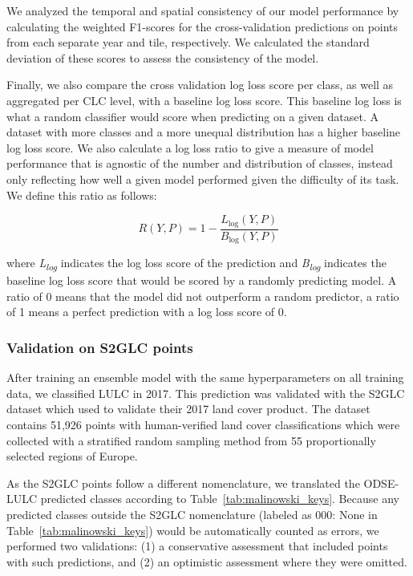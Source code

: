         We analyzed the temporal and spatial consistency of our model performance by calculating the weighted F1-scores for the cross-validation predictions on points from each separate year and tile, respectively. We calculated the standard deviation of these scores to assess the consistency of the model. 
        
        Finally, we also compare the cross validation log loss score per class, as well as aggregated per CLC level, with a baseline log loss score. This baseline log loss is what a random classifier would score when predicting on a given dataset. A dataset with more classes and a more unequal distribution has a higher baseline log loss score. We also calculate a log loss ratio to give a measure of model performance that is agnostic of the number and distribution of classes, instead only reflecting how well a given model performed given the difficulty of its task. We define this ratio as follows:
        
        \begin{equation}
            R(Y,P) = 1-\frac{L_{\log}(Y, P)}{B_{\log}(Y, P)}
        \end{equation}
        
        \noindent where \emph{L\textsubscript{log}} indicates the log loss score of the prediction and \emph{B\textsubscript{log}} indicates the baseline log loss score that would be scored by a randomly predicting model. A ratio of 0 means that the model did not outperform a random predictor, a ratio of 1 means a perfect prediction with a log loss score of 0.
    
    \subsubsection*{Validation on S2GLC points}
        
        After training an ensemble model with the same hyperparameters on all training data, we classified LULC in 2017. This prediction was validated with the S2GLC dataset which \citet{malinowski2020} used to validate their 2017 land cover product. The dataset contains 51,926 points with human-verified land cover classifications which were collected with a stratified random sampling method from 55 proportionally selected regions of Europe.
        
        As the S2GLC points follow a different nomenclature, we translated the  ODSE-LULC predicted classes according to Table\@~\ref{tab:malinowski_keys}. Because any predicted classes outside the S2GLC nomenclature (labeled as 000: None in Table\@~\ref{tab:malinowski_keys}) would be automatically counted as errors, we performed two validations: (1) a conservative assessment that included  points with such predictions, and (2) an optimistic assessment where they were omitted.
        
